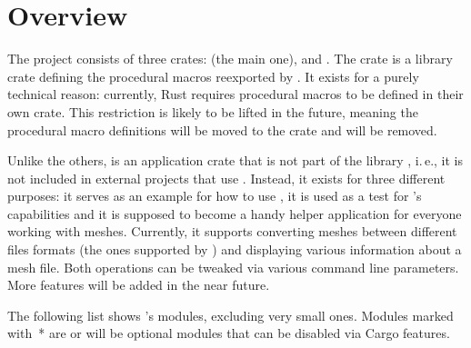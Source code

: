 \section{Overview}

The project consists of three crates:  (the main one),  and .
The crate  is a library crate defining the procedural macros reexported by .
It exists for a purely technical reason: currently, Rust requires procedural macros to be defined in their own crate.
This restriction is likely to be lifted in the future, meaning the procedural macro definitions will be moved to the crate  and  will be removed.

Unlike the others,  is an application crate that is not part of the library , i.\,e., it is not included in external projects that use .
Instead, it exists for three different purposes: it serves as an example for how to use , it is used as a test for 's capabilities and it is supposed to become a handy helper application for everyone working with meshes.
Currently, it supports converting meshes between different files formats (the ones supported by ) and displaying various information about a mesh file.
Both operations can be tweaked via various command line parameters.
More features will be added in the near future.

The following list shows 's modules, excluding very small ones.
Modules marked with~* are or will be optional modules that can be disabled via Cargo features.

